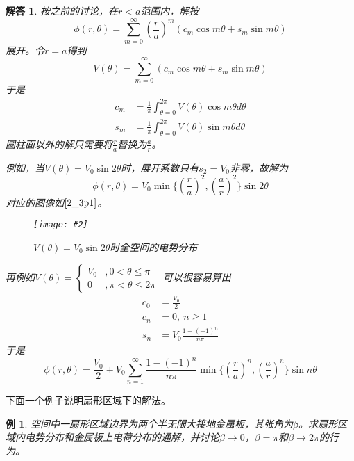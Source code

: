 \documentclass[a4paper,11pt]{ctexart}
\newcommand{\cpic}[2]{
\begin{center}
\texttt{[image: \#2]}
\end{center}
}
\newcommand{\cpicn}[3]
{
\begin{figure}[H]
\cpic{#1}{#2}
\caption{#3\label{#2}}
\end{figure}
}
\newtheorem{eg}{例}[section]
\newtheorem{ans}{解答}[section]
\newcommand{\beq}{\begin{equation}}
\newcommand{\eeq}{\end{equation}}
\newcommand{\bea}{\begin{equation}\begin{aligned}}
\newcommand{\eea}{\end{aligned}\end{equation}}
\begin{document}
\begin{ans}
按之前的讨论，在$r<a$范围内，解按
\beq
\phi(r,\theta) = \sum_{m=0}^\infty \left( \frac{r}{a} \right)^m \left( c_m \cos m \theta + s_m \sin m \theta \right)
\eeq
展开。令$r=a$得到
\beq
V(\theta) = \sum_{m=0}^\infty  \left( c_m \cos m \theta + s_m \sin m \theta \right)
\eeq
于是
\bea
c_m &= \frac{1}{\pi} \int_{\theta=0}^{2\pi} V(\theta) \cos m \theta d\theta \\
s_m &= \frac{1}{\pi} \int_{\theta=0}^{2\pi} V(\theta) \sin m \theta d\theta
\eea
圆柱面以外的解只需要将$\frac{r}{a}$替换为$\frac{a}{r}$。
\par
例如，当$V(\theta) = V_0 \sin 2\theta$时，展开系数只有$s_2 = V_0$非零，故解为
\beq
\phi(r,\theta) = V_0 \min \{ \left( \frac{r}{a}\right)^2 ,\left( \frac{a}{r} \right)^2\}  \sin 2\theta
\eeq
对应的图像如$\cref{2_3p1}$。
\cpicn{0.12}{2_3p1}{$V(\theta) = V_0 \sin 2\theta$时全空间的电势分布}
\par
再例如$V(\theta) = \begin{cases}
V_0 &, 0<\theta \leq \pi \\
0 &, \pi <\theta \leq 2\pi
\end{cases}$
可以很容易算出
\bea
c_0 &= \frac{V_0}{2}\\
c_n&=0,\ n \geq 1 \\
s_n &= V_0\frac{1 - (-1)^n}{n\pi}
\eea
于是
\beq
\phi(r,\theta) = \frac{V_0}{2}+V_0 \sum_{n=1}^\infty  \frac{1 - (-1)^n}{n\pi} \min \{ \left(\frac{r}{a}\right)^n , \left(\frac{a}{r} \right)^n \} \sin n \theta
\eeq

\end{ans}
\par
下面一个例子说明扇形区域下的解法。
\begin{eg}
空间中一扇形区域边界为两个半无限大接地金属板，其张角为$\beta$。求扇形区域内电势分布和金属板上电荷分布的通解，并讨论$\beta \to 0$，$\beta = \pi$和$\beta \to 2\pi$的行为。
\end{eg}
\end{document}
